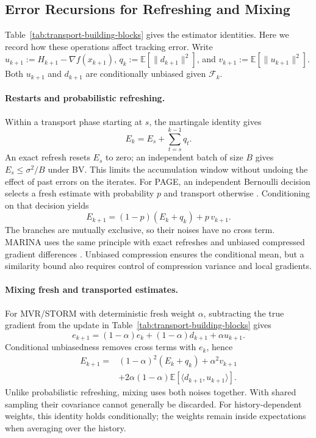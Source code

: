 \subsection{Error Recursions for Refreshing and Mixing}
\label{app:algorithmic-details}

Table~\ref{tab:transport-building-blocks} gives the estimator identities.
Here we record how these operations affect tracking error. Write
$u_{k+1}:=H_{k+1}-\nabla f(x_{k+1})$,
$q_k:=\mathbb E[\|d_{k+1}\|^2]$, and
$v_{k+1}:=\mathbb E[\|u_{k+1}\|^2]$.
Both $u_{k+1}$ and $d_{k+1}$ are conditionally unbiased given
$\mathcal F_k$.

\paragraph{Restarts and probabilistic refreshing.}
Within a transport phase starting at $s$, the martingale identity gives
\begin{equation}
\label{eq:restart-error-window}
E_k=E_s+\sum_{t=s}^{k-1}q_t.
\end{equation}
An exact refresh resets $E_s$ to zero; an independent batch of size
$B$ gives $E_s\leq\sigma^2/B$ under BV. This limits the accumulation
window without undoing the effect of past errors on the iterates.
For PAGE, an independent Bernoulli decision selects a fresh estimate
with probability $p$ and transport otherwise \citep{li2021page}.
Conditioning on that decision yields
\begin{equation}
\label{eq:refresh-error-recursion}
E_{k+1}=(1-p)(E_k+q_k)+p\,v_{k+1}.
\end{equation}
The branches are mutually exclusive, so their noises have no cross
term. MARINA uses the same principle with exact refreshes and
unbiased compressed gradient differences \citep{gorbunov2021marina}.
Unbiased compression ensures the conditional mean, but a similarity
bound also requires control of compression variance and local gradients.

\paragraph{Mixing fresh and transported estimates.}
For MVR/STORM with deterministic fresh weight $\alpha$,
subtracting the true gradient from the update in
Table~\ref{tab:transport-building-blocks} gives
\begin{equation}
\label{eq:mvr-error-recursion}
e_{k+1}=(1-\alpha)e_k+(1-\alpha)d_{k+1}+\alpha u_{k+1}.
\end{equation}
Conditional unbiasedness removes cross terms with $e_k$, hence
\[
\begin{split}
E_{k+1}={}&(1-\alpha)^2(E_k+q_k)+\alpha^2v_{k+1}\\
&+2\alpha(1-\alpha)\mathbb E[\langle d_{k+1},u_{k+1}\rangle].
\end{split}
\]
Unlike probabilistic refreshing, mixing uses both noises together.
With shared sampling their covariance cannot generally be discarded.
For history-dependent weights, this identity holds conditionally;
the weights remain inside expectations when averaging over the history.

